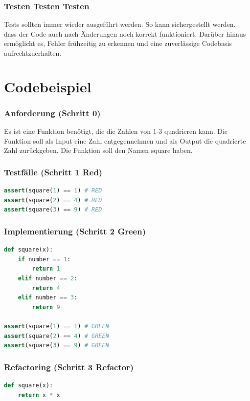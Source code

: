\documentclass[a0,landscape]{a0poster}
\newcommand{\gqq}[1]{\glqq #1\grqq}
\begin{document}
\begin{multicols}{4}
\subsubsection*{Testen Testen Testen}
Tests sollten immer wieder ausgeführt werden. So kann sichergestellt werden, dass der Code auch nach Änderungen noch korrekt funktioniert. Darüber hinaus ermöglicht es, Fehler frühzeitig zu erkennen und eine zuverlässige Codebasis aufrechtzuerhalten.

\section*{Codebeispiel}

\subsubsection*{Anforderung (Schritt 0)}
Es ist eine Funktion benötigt, die die Zahlen von 1-3 quadrieren kann.
Die Funktion soll als Input eine Zahl entgegennehmen und als Output die quadrierte Zahl zurückgeben.
Die Funktion soll den Namen \gqq{square} haben.

\subsubsection*{Testfälle (Schritt 1 \gqq{Red})}

\begin{lstlisting}[language=Python]
assert(square(1) == 1) # RED
assert(square(2) == 4) # RED
assert(square(3) == 9) # RED
\end{lstlisting}

\subsubsection*{Implementierung (Schritt 2 \gqq{Green})}
\begin{lstlisting}[language=Python]
def square(x):
    if number == 1:
        return 1
    elif number == 2:
        return 4
    elif number == 3:
        return 9

assert(square(1) == 1) # GREEN
assert(square(2) == 4) # GREEN
assert(square(3) == 9) # GREEN
\end{lstlisting}

\subsubsection*{Refactoring (Schritt 3 \gqq{Refactor})}
\begin{lstlisting}[language=Python]
def square(x):
    return x * x


\end{lstlisting}
\end{multicols}
\end{document}
